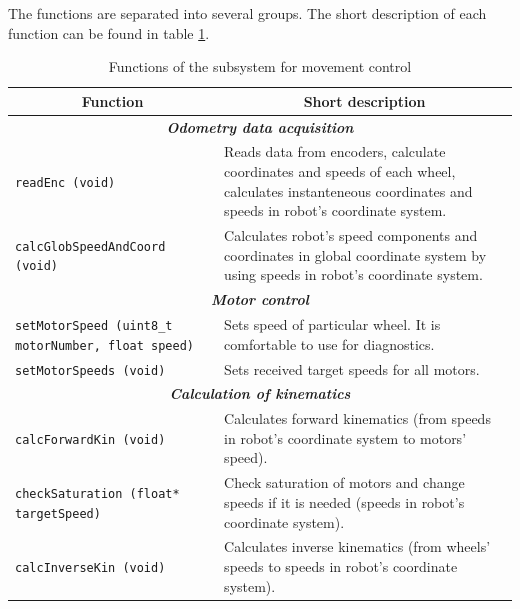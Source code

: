 \documentclass[a4paper,12pt]{article} %
\newcommand{\textitbf}[1]{\textbf{\textit{#1}}}
\newcommand{\inlinecode}[1]{\lstinline{#1}}
\begin{document}
The functions are separated into several groups. The short description of each function can be found in table \ref{tab:functions_for_movement}.

\begin{longtable}[H]{|m{6 cm}|m{7 cm}|}
\caption{ Functions of the subsystem for movement control}\label{tab:functions_for_movement}\\
\hline
\multicolumn{1}{|c|}{Function} & \multicolumn{1}{|c|}{Short description} \\
\hline

\multicolumn{2}{|c|}{\textitbf{Odometry data acquisition}} \\
\hline
\inlinecode{readEnc (void)} & Reads data from encoders, calculate coordinates and speeds of each wheel, calculates instanteneous coordinates and speeds in robot's coordinate system. \\
\hline
\inlinecode{calcGlobSpeedAndCoord (void)}& Calculates robot's speed components and coordinates in global coordinate system by using speeds in robot's coordinate system.\\
\hline

\multicolumn{2}{|c|}{\textitbf{Motor control}} \\
\hline
\inlinecode{setMotorSpeed (uint8_t motorNumber, float speed)} & Sets speed of particular wheel. It is comfortable to use for diagnostics. \\
\hline
\inlinecode{setMotorSpeeds (void)} &Sets received target speeds for all motors. \\
\hline

\multicolumn{2}{|c|}{\textitbf{Calculation of kinematics}}\\
\hline
\inlinecode{calcForwardKin (void)}  & Calculates forward kinematics (from speeds in robot's coordinate system to motors' speed).\\
\hline
\inlinecode{checkSaturation (float* targetSpeed)} & Check saturation of motors and change speeds if it is needed (speeds in robot's coordinate system).\\
\hline
\inlinecode{calcInverseKin (void)} & Calculates inverse kinematics (from wheels' speeds to speeds in robot's coordinate system).\\
\hline


\end{longtable}
\end{document}
